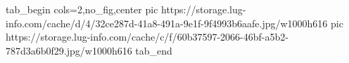  
 
 
 
 


\ifcmt
  tab_begin cols=2,no_fig,center
     pic https://storage.lug-info.com/cache/d/4/32ce287d-41a8-491a-9e1f-9f4993b6aafe.jpg/w1000h616
		 pic https://storage.lug-info.com/cache/c/f/60b37597-2066-46bf-a5b2-787d3a6b0f29.jpg/w1000h616
  tab_end
\fi
